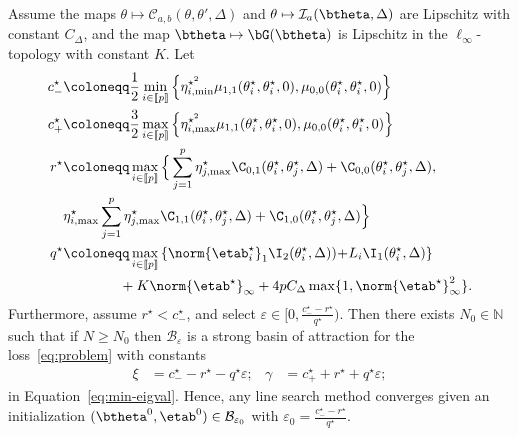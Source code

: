 \documentclass[conference,english,final,svgnames]{IEEEtran}
\begin{document}
\begin{theorem}
\label{thm:main-result}
    Assume the maps $\theta \mapsto \mathcal{C}_{a,b}(\theta, 
    \theta',\Delta)$ and $\theta \mapsto \mathcal{I}_{a}(\btheta,\Delta)$ are Lipschitz with constant $C_\Delta$, and the map $\btheta \mapsto \bG(\btheta)$ is Lipschitz in the $\ell_\infty$-topology with constant $K$. Let
    \begin{subequations}
        \begin{align}
        c^\star_- &\coloneqq \frac{1}{2} \min_{i\in \llbracket p \rrbracket} \left\{\eta^{\star^2}_{i,\min} \mu_{1,1}(\theta_i^
        \star, \theta_i^\star, 0), \mu_{0,0} (\theta_i^\star, \theta_i^\star, 0) \right\} \label{eq:def_c_minus}\\
        c^\star_+ &\coloneqq \frac{3}{2} \max_{i\in \llbracket p \rrbracket} \left\{\eta^{\star^2}_{i,\max} \mu_{1,1}(\theta_i^
        \star, \theta_i^\star, 0), \mu_{0,0} (\theta_i^\star, \theta_i^\star, 0) \right\} \label{eq:def_c_plus}\\
        r^\star &\coloneqq \max_{i\in \llbracket p \rrbracket} \Big\{ \sum_{j=1}^p \eta^\star_{j,\max}\C_{0,1}(\theta_i^\star,\theta_j^\star, \Delta) + \C_{0,0}(\theta_i^\star, \theta_j^\star, \Delta) , \nonumber \\
        &  \eta^{\star}_{i,\max}  \sum_{j=1}^p \eta^{\star}_{j,\max}\C_{1,1}(\theta_i^\star,\theta_j^\star, \Delta) + \C_{1,0}(\theta_i^\star, \theta_j^\star, \Delta)   \Big\} \label{eq:def_r}\\
        q^\star &\coloneqq \max_{i\in \llbracket p \rrbracket} \left\{ \norm{\etab_i^\star}_{1}\I_2(\theta_i^\star, \Delta)) \hspace{-2pt}+\hspace{-2pt} L_i \I_1(\theta_i^\star, \Delta) \right\} \nonumber \\
        & \qquad \qquad + K\norm{\etab^{\star}}_{\infty} + 4pC_\Delta\max\{1, \norm{\etab^{\star}}_{\infty}^2 \}. \label{eq:def_q} 
    \end{align}
    \end{subequations}
    Furthermore, assume $r^\star < c^\star_-$, and select $\varepsilon \in [0, \tfrac{c^\star_- - r^\star}{q^\star})$. Then there exists $N_0 \in \mathbb{N}$ such that if $N \geq N_0$ then $\mathcal{B}_\varepsilon$ is a strong basin of attraction for the loss~\eqref{eq:problem} with constants
    \begin{align*}
        \xi &= c^\star_- - r^\star - q^\star\varepsilon; & \gamma&= c^\star_+ + r^\star + q^\star\varepsilon;
    \end{align*}
    in Equation~\eqref{eq:min-eigval}. Hence, any line search method converges given an initialization $(\btheta^0,\etab^0) \in \mathcal{B}_{\varepsilon_0}$ with $\varepsilon_0 = \frac{c^\star_- - r^\star}{q^\star}$.
\end{theorem}
\end{document}
